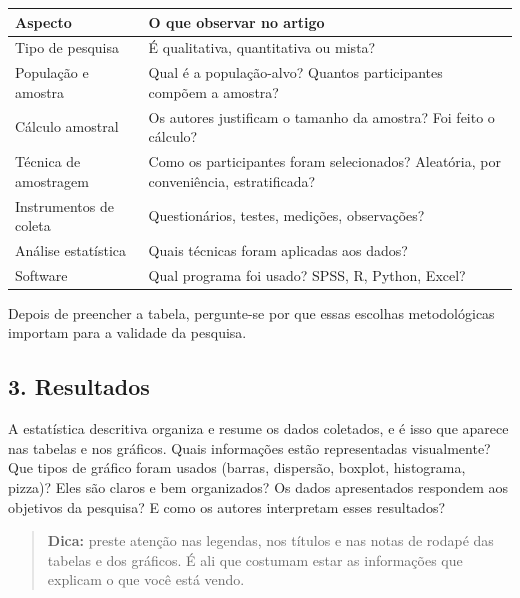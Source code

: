 \documentclass[
]{book}
\newcounter{none} %
\begin{document}
{\def\LTcaptype{none} %
\begin{longtable}[]{@{}
  >{\raggedright\arraybackslash}p{}
  >{\raggedright\arraybackslash}p{}@{}}
\toprule\noalign{}
\begin{minipage}[b]{\linewidth}\raggedright
Aspecto
\end{minipage} & \begin{minipage}[b]{\linewidth}\raggedright
O que observar no artigo
\end{minipage} \\
\midrule\noalign{}
\endhead
\bottomrule\noalign{}
\endlastfoot
Tipo de pesquisa & É qualitativa, quantitativa ou mista? \\
População e amostra & Qual é a população-alvo? Quantos participantes compõem a amostra? \\
Cálculo amostral & Os autores justificam o tamanho da amostra? Foi feito o cálculo? \\
Técnica de amostragem & Como os participantes foram selecionados? Aleatória, por conveniência, estratificada? \\
Instrumentos de coleta & Questionários, testes, medições, observações? \\
Análise estatística & Quais técnicas foram aplicadas aos dados? \\
Software & Qual programa foi usado? SPSS, R, Python, Excel? \\
\end{longtable}
}

Depois de preencher a tabela, pergunte-se por que essas escolhas metodológicas importam para a validade da pesquisa.

\subsection{3. Resultados}\label{resultados}

A estatística descritiva organiza e resume os dados coletados, e é isso que aparece nas tabelas e nos gráficos. Quais informações estão representadas visualmente? Que tipos de gráfico foram usados (barras, dispersão, boxplot, histograma, pizza)? Eles são claros e bem organizados? Os dados apresentados respondem aos objetivos da pesquisa? E como os autores interpretam esses resultados?

\begin{quote}
\textbf{Dica:} preste atenção nas legendas, nos títulos e nas notas de rodapé das tabelas e dos gráficos. É ali que costumam estar as informações que explicam o que você está vendo.
\end{quote}
\end{document}
